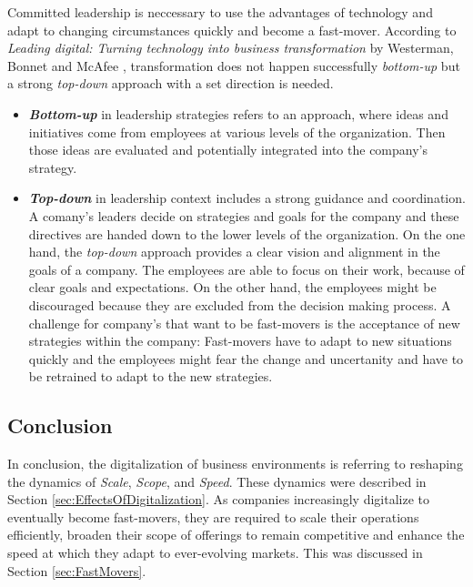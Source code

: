 \documentclass[a4]{scrartcl}
\begin{document}
	
	Committed leadership is neccessary to use the advantages of technology and adapt to changing circumstances quickly and become a fast-mover. According to \textit{Leading digital: Turning technology into business transformation} by Westerman, Bonnet and McAfee \cite{leadingdigital}, transformation does not happen successfully \textit{bottom-up} but a strong \textit{top-down} approach with a set direction is needed.


	\begin{itemize}
		
		\item \textit{\textbf{Bottom-up}} in leadership strategies refers to an approach, where ideas and initiatives come from employees at various levels of the organization. Then those ideas are evaluated and potentially integrated into the company's strategy.~\cite{tdbu}
		
		\item \textit{\textbf{Top-down}} in leadership context includes a strong guidance and coordination. A comany's leaders decide on strategies and goals for the company and these directives are handed down to the lower levels of the organization.
		On the one hand, the \textit{top-down} approach provides a clear vision and alignment in the goals of a company. The employees are able to focus on their work, because of clear goals and expectations. On the other hand, the employees might be discouraged because they are excluded from the decision making process.
		A challenge for company's that want to be fast-movers is the acceptance of new strategies within the company: Fast-movers have to adapt to new situations quickly and the employees might fear the change and uncertanity and have to be retrained to adapt to the new strategies.~\cite{tdbu, leadingdigital}
		
		
	\end{itemize}
	
	\subsection{Conclusion} \label{subsec:conc}
	
	In conclusion, the digitalization of business environments is referring to reshaping the dynamics of \textit{Scale}, \textit{Scope}, and \textit{Speed}. These dynamics were described in Section \ref{sec:EffectsOfDigitalization}. As companies increasingly digitalize to eventually become fast-movers, they are required to scale their operations efficiently, broaden their scope of offerings to remain competitive and enhance the speed at which they adapt to ever-evolving markets. This was discussed in Section \ref{sec:FastMovers}.
	
\end{document}
